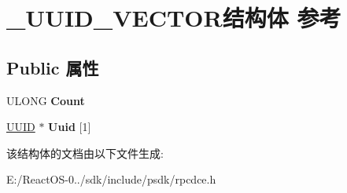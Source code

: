 \hypertarget{struct___u_u_i_d___v_e_c_t_o_r}{}\section{\+\_\+\+U\+U\+I\+D\+\_\+\+V\+E\+C\+T\+O\+R结构体 参考}
\label{struct___u_u_i_d___v_e_c_t_o_r}
\subsection*{Public 属性}
\begin{DoxyCompactItemize}
\item 
\mbox{\label{struct___u_u_i_d___v_e_c_t_o_r_a7a542f398c709b7a2cc8b38ddb11d307}} 
U\+L\+O\+NG {\bfseries Count}
\item 
\mbox{\label{struct___u_u_i_d___v_e_c_t_o_r_a6c5e3cf788bbf2c33b2d822a5282e779}} 
\hyperlink{interface_g_u_i_d}{U\+U\+ID} $\ast$ {\bfseries Uuid} \mbox{[}1\mbox{]}
\end{DoxyCompactItemize}


该结构体的文档由以下文件生成\+:\begin{DoxyCompactItemize}
\item 
E\+:/\+React\+O\+S-\/0../sdk/include/psdk/rpcdce.\+h\end{DoxyCompactItemize}
